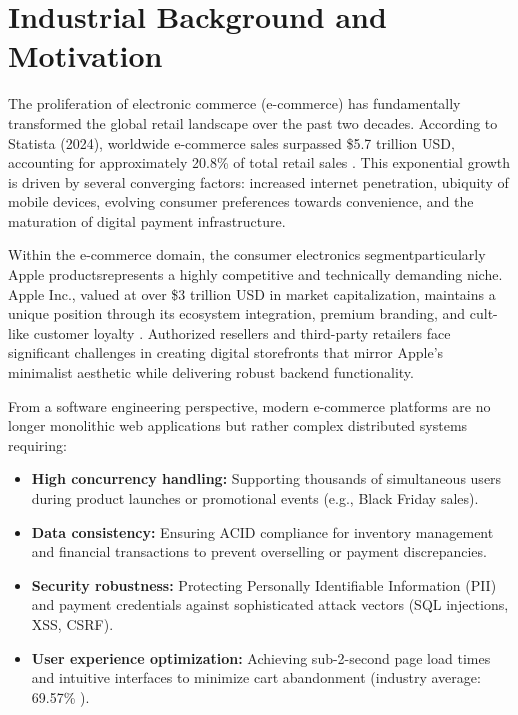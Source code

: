 \documentclass[12pt, a4paper]{report}
\begin{document}
\section{Industrial Background and Motivation}

The proliferation of electronic commerce (e-commerce) has fundamentally transformed the global retail landscape over the past two decades. According to Statista (2024), worldwide e-commerce sales surpassed \$5.7 trillion USD, accounting for approximately 20.8\% of total retail sales \cite{statista2024}. This exponential growth is driven by several converging factors: increased internet penetration, ubiquity of mobile devices, evolving consumer preferences towards convenience, and the maturation of digital payment infrastructure.

Within the e-commerce domain, the consumer electronics segmentparticularly Apple productsrepresents a highly competitive and technically demanding niche. Apple Inc., valued at over \$3 trillion USD in market capitalization, maintains a unique position through its ecosystem integration, premium branding, and cult-like customer loyalty \cite{apple2024}. Authorized resellers and third-party retailers face significant challenges in creating digital storefronts that mirror Apple's minimalist aesthetic while delivering robust backend functionality.

From a software engineering perspective, modern e-commerce platforms are no longer monolithic web applications but rather complex distributed systems requiring:

\begin{itemize}
    \item \textbf{High concurrency handling:} Supporting thousands of simultaneous users during product launches or promotional events (e.g., Black Friday sales).
    \item \textbf{Data consistency:} Ensuring ACID compliance for inventory management and financial transactions to prevent overselling or payment discrepancies.
    \item \textbf{Security robustness:} Protecting Personally Identifiable Information (PII) and payment credentials against sophisticated attack vectors (SQL injections, XSS, CSRF).
   

 \item \textbf{User experience optimization:} Achieving sub-2-second page load times and intuitive interfaces to minimize cart abandonment (industry average: 69.57\% \cite{baymard2023}).
\end{itemize}
\end{document}
